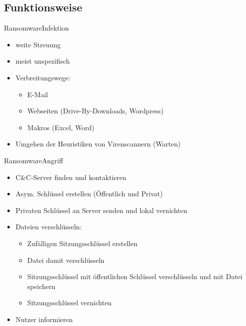 \documentclass[10pt]{beamer}
\begin{document}
\subsection{Funktionsweise}
\begin{frame}{Ransomware}{Infektion}
		\begin{itemize}
			\item weite Streuung
			\item meist unspezifisch
			\item Verbreitungswege:
				\begin{itemize}
					\item E-Mail
					\item Webseiten (Drive-By-Downloads, Wordpress)
					\item Makros (Excel, Word)
				\end{itemize}
			\item Umgehen der Heuristiken von Virenscannern (Warten)
		\end{itemize}
\end{frame}
\begin{frame}{Ransomware}{Angriff}
		\begin{itemize}
			\item C\&C-Server finden und kontaktieren 
			\item Asym. Schlüssel erstellen (Öffentlich und Privat)
			\item Privaten Schlüssel an Server senden und lokal vernichten
			\item Dateien verschlüsseln:
				\begin{itemize}
					\item Zufälligen Sitzungsschlüssel erstellen
					\item Datei damit verschlüsseln
					\item Sitzungsschlüssel mit öffentlichen Schlüssel verschlüsseln und mit Datei speichern
					\item Sitzungsschlüssel vernichten
				\end{itemize}
			\item Nutzer informieren
		\end{itemize}
\end{frame}


\end{document}

